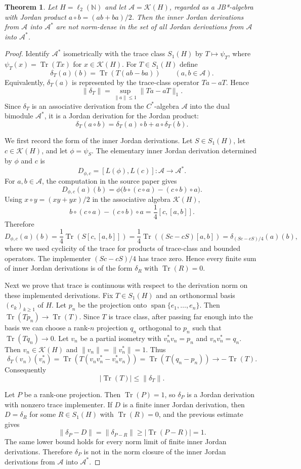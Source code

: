 \documentclass[11pt]{article}
\newtheorem{theorem}{Theorem}
\newcommand{\A}{\mathcal A}
\newcommand{\K}{\mathcal K}
\newcommand{\N}{\mathbb N}
\newcommand{\Tr}{\operatorname{Tr}}
\begin{document}
\begin{theorem}
Let $H=\ell_2(\N)$ and let $\A=\K(H)$, regarded as a JB*-algebra with Jordan
product $a\circ b=(ab+ba)/2$. Then the inner Jordan derivations from
$\A$ into $\A^*$ are not norm-dense in the set of all Jordan derivations from
$\A$ into $\A^*$.
\end{theorem}

\begin{proof}
Identify $\A^*$ isometrically with the trace class $S_1(H)$ by
$T\mapsto \psi_T$, where $\psi_T(x)=\Tr(Tx)$ for $x\in\K(H)$. For
$T\in S_1(H)$ define
\[
  \delta_T(a)(b)=\Tr(T(ab-ba)) \qquad (a,b\in\A).
\]
Equivalently, $\delta_T(a)$ is represented by the trace-class operator
$Ta-aT$. Hence
\[
  \|\delta_T\|=\sup_{\|a\|\leq 1}\|Ta-aT\|_1 .
\]
Since $\delta_T$ is an associative derivation from the $C^*$-algebra $\A$
into the dual bimodule $\A^*$, it is a Jordan derivation for the Jordan
product:
\[
  \delta_T(a\circ b)=\delta_T(a)\circ b+a\circ\delta_T(b).
\]

We first record the form of the inner Jordan derivations. Let
$S\in S_1(H)$, let $c\in\K(H)$, and let $\phi=\psi_S$. The elementary inner
Jordan derivation determined by $\phi$ and $c$ is
\[
  D_{\phi,c}=[L(\phi),L(c)] : \A\to\A^*.
\]
For $a,b\in\A$, the computation in the source paper gives
\[
  D_{\phi,c}(a)(b)
  =\phi\bigl(b\circ(c\circ a)-(c\circ b)\circ a\bigr).
\]
Using $x\circ y=(xy+yx)/2$ in the associative algebra $\K(H)$,
\[
  b\circ(c\circ a)-(c\circ b)\circ a
  =\frac{1}{4}[c,[a,b]].
\]
Therefore
\[
  D_{\phi,c}(a)(b)
  =\frac{1}{4}\Tr(S[c,[a,b]])
  =\frac{1}{4}\Tr((Sc-cS)[a,b])
  =\delta_{(Sc-cS)/4}(a)(b),
\]
where we used cyclicity of the trace for products of trace-class and bounded
operators. The implementer $(Sc-cS)/4$ has trace zero. Hence every finite sum
of inner Jordan derivations is of the form $\delta_R$ with $\Tr(R)=0$.

Next we prove that trace is continuous with respect to the derivation norm on
these implemented derivations. Fix $T\in S_1(H)$ and an orthonormal basis
$(e_k)_{k\geq 1}$ of $H$. Let $p_n$ be the projection onto
$\operatorname{span}\{e_1,\ldots,e_n\}$. Then $\Tr(Tp_n)\to\Tr(T)$. Since
$T$ is trace class, after passing far enough into the basis we can choose a
rank-$n$ projection $q_n$ orthogonal to $p_n$ such that $\Tr(Tq_n)\to 0$.
Let $v_n$ be a partial isometry with $v_n^*v_n=p_n$ and $v_nv_n^*=q_n$.
Then $v_n\in\K(H)$ and $\|v_n\|=\|v_n^*\|=1$. Thus
\[
  \delta_T(v_n)(v_n^*)
  =\Tr(T(v_nv_n^*-v_n^*v_n))
  =\Tr(T(q_n-p_n))\longrightarrow -\Tr(T).
\]
Consequently
\[
  |\Tr(T)|\leq \|\delta_T\|.
\]

Let $P$ be a rank-one projection. Then $\Tr(P)=1$, so $\delta_P$ is a Jordan
derivation with nonzero trace implementer. If $D$ is a finite inner Jordan
derivation, then $D=\delta_R$ for some $R\in S_1(H)$ with $\Tr(R)=0$, and the
previous estimate gives
\[
  \|\delta_P-D\|=\|\delta_{P-R}\|\geq |\Tr(P-R)|=1.
\]
The same lower bound holds for every norm limit of finite inner Jordan
derivations. Therefore $\delta_P$ is not in the norm closure of the inner
Jordan derivations from $\A$ into $\A^*$.
\end{proof}
\end{document}
